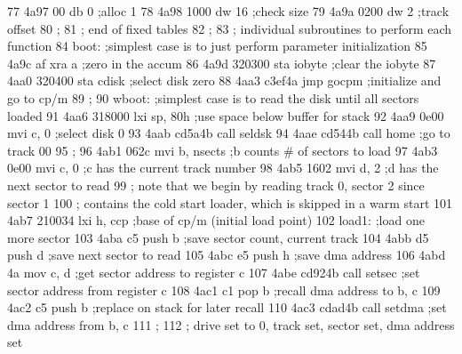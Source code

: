  77      4a97 00                   db     0              ;alloc 1
 78      4a98 1000                 dw     16             ;check size
 79      4a9a 0200                 dw     2              ;track offset
 80                       ;
 81                       ;        end of fixed tables
 82                       ;
 83                       ;        individual subroutines to perform each function
 84                       boot:    ;simplest case is to just perform parameter initialization
 85      4a9c af                   xra    a              ;zero in the accum
 86      4a9d 320300               sta    iobyte         ;clear the iobyte
 87      4aa0 320400               sta    cdisk          ;select disk zero
 88      4aa3 c3ef4a               jmp    gocpm          ;initialize and go to cp/m
 89                       ;
 90                       wboot:   ;simplest case is to read the disk until all sectors loaded
 91      4aa6 318000               lxi    sp, 80h        ;use space below buffer for stack
 92      4aa9 0e00                 mvi    c, 0           ;select disk 0
 93      4aab cd5a4b               call   seldsk
 94      4aae cd544b               call   home           ;go to track 00
 95                       ;
 96      4ab1 062c                 mvi    b, nsects      ;b counts # of sectors to load
 97      4ab3 0e00                 mvi    c, 0           ;c has the current track number
 98      4ab5 1602                 mvi    d, 2           ;d has the next sector to read
 99                       ;        note that we begin by reading track 0, sector 2 since sector 1
100                       ;        contains the cold start loader, which is skipped in a warm start
101      4ab7 210034               lxi    h, ccp         ;base of cp/m (initial load point)
102                       load1:   ;load one more sector
103      4aba c5                   push   b              ;save sector count, current track
104      4abb d5                   push   d              ;save next sector to read
105      4abc e5                   push   h              ;save dma address
106      4abd 4a                   mov    c, d           ;get sector address to register c
107      4abe cd924b               call   setsec         ;set sector address from register c
108      4ac1 c1                   pop    b              ;recall dma address to b, c
109      4ac2 c5                   push   b              ;replace on stack for later recall
110      4ac3 cdad4b               call   setdma         ;set dma address from b, c
111                       ; 
112                       ;        drive set to 0, track set, sector set, dma address set
